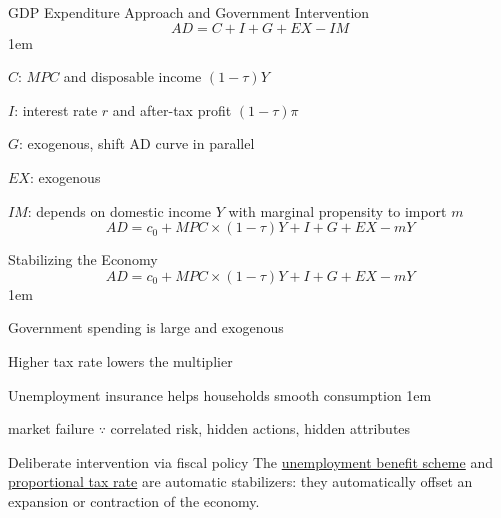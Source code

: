 \documentclass[11pt,aspectratio=43,usenames,dvipsnames]{beamer}
\let\olditemize=\itemize
\let\endolditemize=\enditemize
\renewenvironment{itemize}{\olditemize \itemsep1em}{\endolditemize}
\theoremstyle{definition}
\begin{document}
\begin{frame}{GDP Expenditure Approach and Government Intervention}
\label{slide:GDP_Expenditure_Approach}
    \begin{equation}
        AD = C + I + G + EX - IM
    \end{equation}
    \begin{itemize}
        \item $ C $: $ MPC $ and disposable income $(1-\tau) Y$
        \item $ I $: interest rate $ r $ and after-tax profit $ (1 - \tau) \pi $
        \item $ G $: exogenous, shift AD curve in parallel
        \item $ EX $: exogenous
        \item $ IM $: depends on domestic income $ Y $ with marginal propensity to import $ m $
    \end{itemize}
    \begin{equation*}
        AD = c_{0} + MPC \times (1 - \tau) Y + I + G + EX - m Y
    \end{equation*}

\end{frame}

\begin{frame}{Stabilizing the Economy}
\label{slide:Stabilizing_the_Economy}
    \begin{equation*}
        AD = c_{0} + MPC \times (1 - \tau) Y + I + G + EX - m Y
    \end{equation*}
    \begin{itemize}
        \item Government spending is large and exogenous
        \item Higher tax rate lowers the multiplier
        \item Unemployment insurance helps households smooth consumption
        \begin{itemize}
            \item market failure $ \because $ correlated risk, hidden actions, hidden attributes
        \end{itemize}
        \item Deliberate intervention via fiscal policy
    \end{itemize}
    The \underline{unemployment benefit scheme} and \underline{proportional tax rate} are \alert{automatic stabilizers}: they \alert{automatically offset} an expansion or contraction of the economy.


\end{frame}
\end{document}
